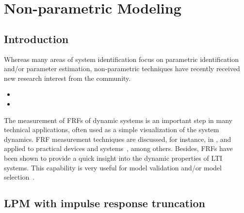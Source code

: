 \chapter{Non-parametric Modeling}
\def\thisDir{ch03-lrm}
\label{sec:nonparametric}

\section{Introduction}
\label{sec:nonparametric:introduction}

Whereas many areas of system identification focus on parametric identification and/or parameter estimation, non-parametric techniques have recently received new research interest from the community.

\begin{itemize}
\item {}
\item {}
\end{itemize}

The measurement of \glspl{FRF} of dynamic systems is an important step in many technical applications, often used as a simple visualization of the system dynamics.
\gls{FRF} measurement techniques are discussed, for instance, in
\citep{Schoukens1998,Schoukens2006LPM,Guillaume1996,Broersen1995,Pintelon2010LPM1,Antoni2007FRF,Pintelon2012}, and applied to practical devices and systems~\citep{Lim2010,Robinson1990,Behjat2010}, among others.
Besides, \glspl{FRF} have been shown to provide a quick insight into the dynamic properties of \gls{LTI} systems.
This capability is very useful for model validation and/or model selection~\citep{Pintelon2012}.



\section{LPM with impulse response truncation}


\section{}


\subsection{}
\subsubsection{}
\subsubsection{}

\subsection{}

\subsubsection{}



